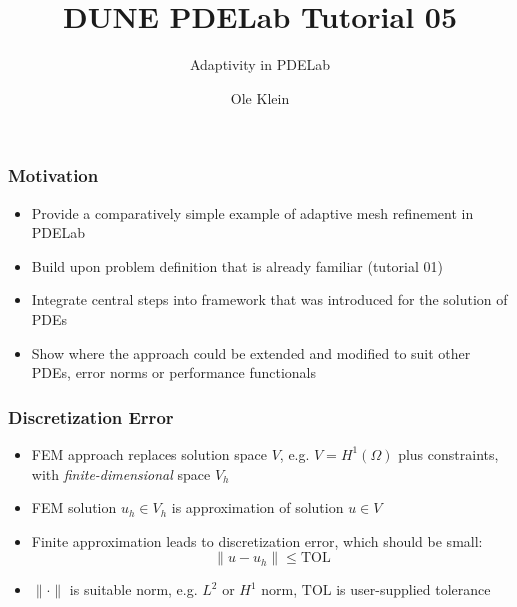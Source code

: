 \documentclass[aspectratio=169,11pt]{beamer}
\title{DUNE PDELab Tutorial 05}
\subtitle{Adaptivity in PDELab}
\author{Ole Klein}
\institute[]
{
  IWR\\
  Heidelberg University
}
\theoremstyle{definition}
\begin{document}


\begin{frame}
\frametitle{Motivation}
\begin{itemize}
  \item Provide a comparatively simple example of adaptive mesh refinement in
    PDELab
  \item Build upon problem definition that is already familiar (tutorial 01)
  \item Integrate central steps into framework that was introduced for the
    solution of PDEs
  \item Show where the approach could be extended and modified to suit other PDEs,
    error norms or performance functionals
\end{itemize}
\end{frame}

\begin{frame}
\frametitle{Discretization Error}
\begin{itemize}
  \item FEM approach replaces solution space $V$, e.g. $V=H^1(\Omega)$ plus
    constraints, with \emph{finite-dimensional} space $V_h$
  \item FEM solution $u_h \in V_h$ is approximation of solution $u \in V$
  \item Finite approximation leads to discretization error, which should be small:
    \begin{equation*}
      \| u - u_h \| \leq \text{TOL}
    \end{equation*}
  \item $\| \cdot \|$ is suitable norm, e.g. $L^2$ or $H^1$ norm, $\text{TOL}$ is
    user-supplied tolerance
\end{itemize}
\end{frame}
\end{document}
